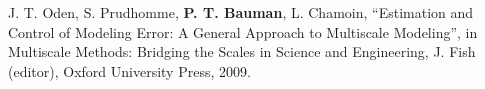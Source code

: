 J. T. Oden, S. Prudhomme, \textbf{P. T. Bauman}, L. Chamoin,
``Estimation and Control of Modeling Error: A General Approach to Multiscale Modeling'',
in Multiscale Methods: Bridging the Scales in Science and Engineering, J. Fish (editor),
Oxford University Press, 2009.

